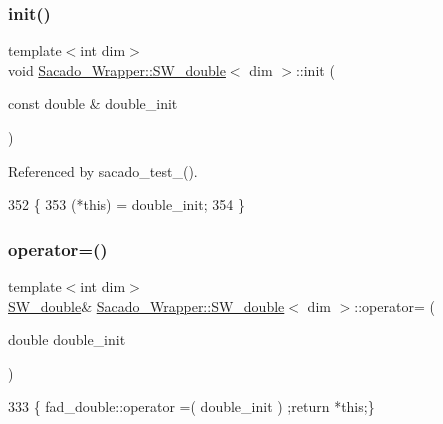 \subsubsection{\texorpdfstring{init()}{init()}}
{\footnotesize\ttfamily template$<$int dim$>$ \\
void \hyperlink{classSacado__Wrapper_1_1SW__double}{Sacado\+\_\+\+Wrapper\+::\+S\+W\+\_\+double}$<$ dim $>$\+::init (\begin{DoxyParamCaption}\item[{const double \&}]{double\+\_\+init }\end{DoxyParamCaption})}



Referenced by sacado\+\_\+test\+\_().


\begin{DoxyCode}
352     \{
353         (*this) = double\_init;
354     \}
\end{DoxyCode}
\mbox{\label{classSacado__Wrapper_1_1SW__double_a355de495ebe0e0b78ea4569fbb697717}} 
\subsubsection{\texorpdfstring{operator=()}{operator=()}\hspace{0.1cm}{\footnotesize\ttfamily [1/2]}}
{\footnotesize\ttfamily template$<$int dim$>$ \\
\hyperlink{classSacado__Wrapper_1_1SW__double}{S\+W\+\_\+double}\& \hyperlink{classSacado__Wrapper_1_1SW__double}{Sacado\+\_\+\+Wrapper\+::\+S\+W\+\_\+double}$<$ dim $>$\+::operator= (\begin{DoxyParamCaption}\item[{double}]{double\+\_\+init }\end{DoxyParamCaption})\hspace{0.3cm}{\ttfamily [inline]}}


\begin{DoxyCode}
333 \{ fad\_double::operator =( double\_init ) ;\textcolor{keywordflow}{return} *\textcolor{keyword}{this};\}
\end{DoxyCode}
\mbox{\label{classSacado__Wrapper_1_1SW__double_ae9d242c29208f994f2eaabd9f5d5fa3c}} 
